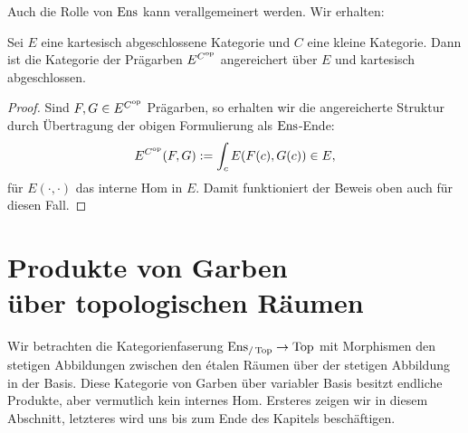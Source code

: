 Auch die Rolle von $\operatorname{Ens}$ kann verallgemeinert werden. Wir erhalten:
\begin{prop} \label{presheaf-cart-closed}
  Sei $E$ eine kartesisch abgeschlossene Kategorie und $C$ eine kleine
  Kategorie. Dann ist die Kategorie der Prägarben $E^{C^\mathrm{op}}$
  angereichert über $E$ und kartesisch abgeschlossen.
\end{prop}
\begin{proof}
  Sind $F, G \in E^{C^\mathrm{op}}$ Prägarben, so erhalten wir die
  angereicherte Struktur durch Übertragung der obigen Formulierung als
  $\operatorname{Ens}$-Ende:
  \[ E^{C^\mathrm{op}}(F, G) := \int_c E(F(c), G(c)) \in E, \]
  für $E(\cdot, \cdot)$ das interne Hom in $E$. Damit funktioniert der
  Beweis oben auch für diesen Fall.
\end{proof}

\section[Produkte von Garben über topologischen Räumen]
        {\texorpdfstring{Produkte von Garben\\ über topologischen Räumen}
          {Produkte von Garben über topologischen Räumen}
          }

Wir betrachten die Kategorienfaserung $\operatorname{Ens}_{/\operatorname{Top}} \to \operatorname{Top}$ mit
Morphismen den stetigen Abbildungen zwischen den étalen Räumen über
der stetigen Abbildung in der Basis. Diese Kategorie von Garben über
variabler Basis besitzt endliche Produkte, aber vermutlich kein
internes Hom. Ersteres zeigen wir in diesem Abschnitt, letzteres wird
uns bis zum Ende des Kapitels beschäftigen.

